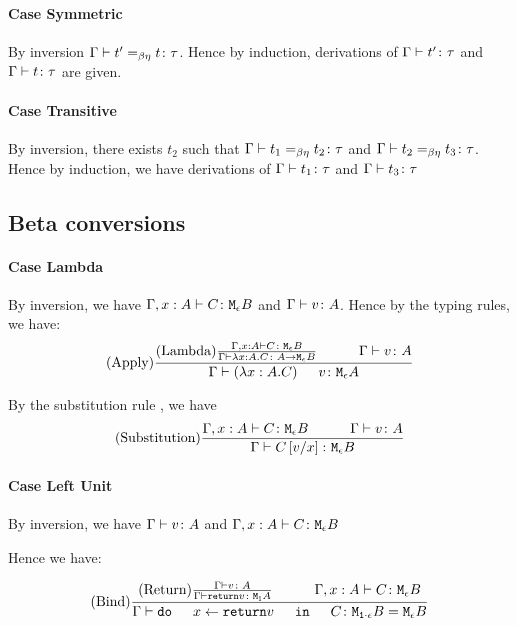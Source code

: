 \documentclass{report}
\begin{document}
    \paragraph{Case Symmetric}
    By inversion $\Gamma \vdash t' =_{\beta\eta} t \colon \tau$. Hence by induction, derivations of $\Gamma \vdash t' \colon \tau$ and $\Gamma \vdash t \colon \tau$ are given.

    \paragraph{Case Transitive}
    By inversion, there exists $t_2$ such that $\Gamma \vdash t_1 =_{\beta\eta} t_2 \colon \tau$ and $\Gamma \vdash t_2 =_{\beta\eta} t_3 \colon \tau$. Hence by induction, we have derivations of $\Gamma \vdash t_1 \colon \tau$ and $\Gamma \vdash t_3 \colon \tau$

    \subsection{Beta conversions}
    
    \paragraph{Case Lambda}
        By inversion, we have $\Gamma, x: A \vdash C \colon \texttt{M}_{\epsilon}{B}$ and $\Gamma \vdash v \colon A$. Hence by the typing rules, we have:
        $$\treerule{Apply}{
            \treerule{Lambda}{\typerelation{\gax }{C}{\meb}}{\gtyperelation{\lam{x}{A}{C}}{\lamtype{A}{\e}{B}}}
            \s\s
            \gtyperelation{v}{A}
        }{\gtyperelation{\apply{(\lam{x}{A}{C})}{v}}{\mea}}$$

        By the substitution rule , we have 
        $$\treerule{Substitution}{\typerelation{\gax}{C}{\meb}\s\s\gtyperelation{v}{A}}{\gtyperelation{C\ssub{x}{v}}{\meb}}$$
        \paragraph{Case Left Unit}
        By inversion, we have $\Gamma \vdash v \colon A$ and $\Gamma, x: A  \vdash C \colon \texttt{M}_{\epsilon}{B}$

        Hence we have:


        \begin{equation}
            \treerule{Bind}{\treerule{Return}{\gtyperelation{v}{A}}{\gtyperelation{\return{v}}{\moa}}\s\s\typerelation{\gax}{C}{\meb}}{\gtyperelation{\doin{x}{\return{v}}{C}}{\M{\1\dot\e}{B} = \meb}}
        \end{equation}
\end{document}
